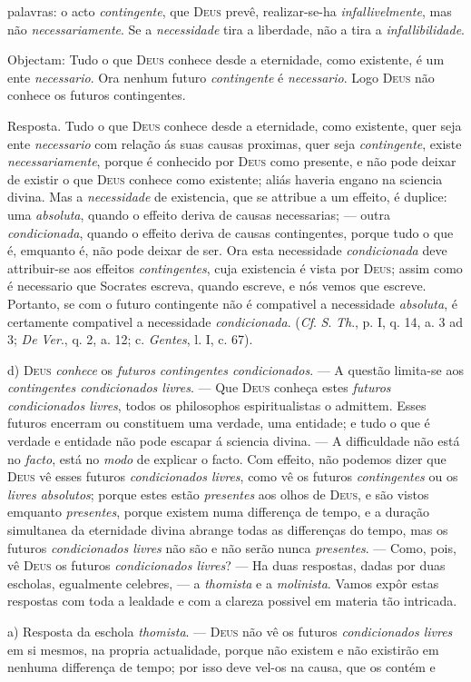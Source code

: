 palavras: o acto \emph{contingente}, que \textsc{Deus} prevê, realizar-se-ha \emph{infallivelmente}, mas não \emph{necessariamente}. Se a \emph{necessidade} tira a liberdade, não a tira a \emph{infallibilidade}.\par Objectam: Tudo o que \textsc{Deus} conhece desde a eternidade, como existente, é um ente \emph{necessario}. Ora nenhum futuro \emph{contingente} é \emph{necessario}. Logo \textsc{Deus} não conhece os futuros contingentes.\par Resposta. Tudo o que \textsc{Deus} conhece desde a eternidade, como existente, quer seja ente \emph{necessario} com relação ás suas causas proximas, quer seja \emph{contingente}, existe \emph{necessariamente}, porque é conhecido por \textsc{Deus} como presente, e não pode deixar de existir o que \textsc{Deus} conhece como existente; aliás haveria engano na sciencia divina. Mas a \emph{necessidade} de existencia, que se attribue a um effeito, é duplice: uma \emph{absoluta}, quando o effeito deriva de causas necessarias; --- outra \emph{condicionada}, quando o effeito deriva de causas contingentes, porque tudo o que é, emquanto é, não pode deixar de ser. Ora esta necessidade \emph{condicionada} deve attribuir-se aos effeitos \emph{contingentes}, cuja existencia é vista por \textsc{Deus}; assim como é necessario que Socrates escreva, quando escreve, e nós vemos que escreve. Portanto, se com o futuro contingente não é compativel a necessidade \emph{absoluta}, é certamente compativel a necessidade \emph{condicionada}. (\emph{Cf}. \emph{S}. \emph{Th}., p. I, q. 14, a. 3 ad 3; \emph{De} \emph{Ver}., q. 2, a. 12; c. \emph{Gentes}, l. I, c. 67).\par d) \textsc{Deus} \emph{conhece} os \emph{futuros contingentes condicionados}. --- A questão limita-se aos \emph{contingentes condicionados livres}. --- Que \textsc{Deus} conheça estes \emph{futuros condicionados livres}, todos os philosophos espiritualistas o admittem. Esses futuros encerram ou constituem uma verdade, uma entidade; e tudo o que é verdade e entidade não pode escapar á sciencia divina. --- A difficuldade não está no \emph{facto}, está no \emph{modo} de explicar o facto. Com effeito, não podemos dizer que \textsc{Deus} vê esses futuros \emph{condicionados livres}, como vê os futuros \emph{contingentes} ou os \emph{livres absolutos}; porque estes estão \emph{presentes} aos olhos de \textsc{Deus}, e são vistos emquanto \emph{presentes}, porque existem numa differença de tempo, e a duração simultanea da eternidade divina abrange todas as differenças do tempo, mas os futuros \emph{condicionados livres} não são e não serão nunca \emph{presentes}. --- Como, pois, vê \textsc{Deus} os futuros \emph{condicionados livres}? --- Ha duas respostas, dadas por duas escholas, egualmente celebres, --- a \emph{thomista} e a \emph{molinista}. Vamos expôr estas respostas com toda a lealdade e com a clareza possivel em materia tão intricada.\par a) Resposta da eschola \emph{thomista}. --- \textsc{Deus} não vê os futuros \emph{condicionados livres} em si mesmos, na propria actualidade, porque não existem e não existirão em nenhuma differença de tempo; por isso deve vel-os na causa, que os contém e 